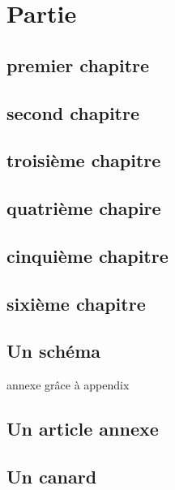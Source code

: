 \documentclass{report}
\begin{document}
\part{Partie}
\chapter{premier chapitre}
\chapter{second chapitre}
\chapter{troisième chapitre}
\chapter{quatrième chapire}
\chapter{cinquième chapitre}
\chapter{sixième chapitre}
\appendix
\chapter{Un schéma}
annexe grâce à appendix
\chapter{Un article annexe}
\chapter{Un canard}
\end{document}
